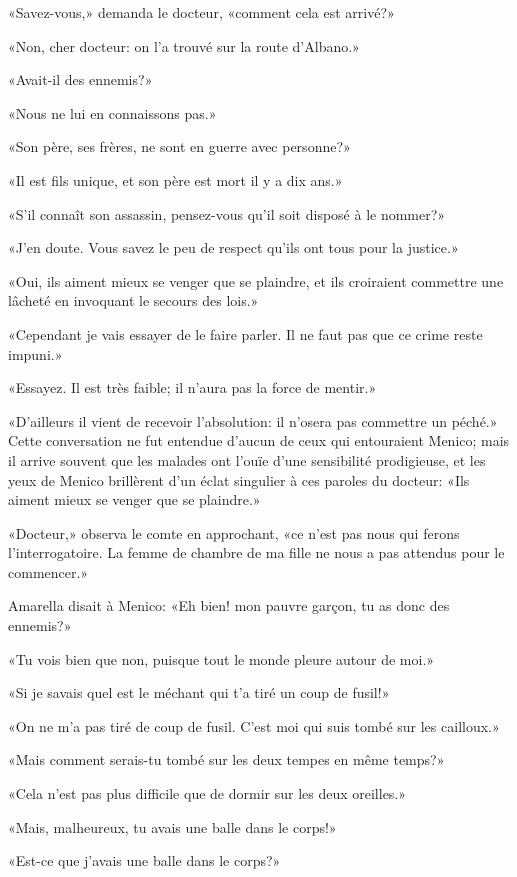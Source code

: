 «Savez-vous,» demanda le docteur, «comment cela est arrivé?»

«Non, cher docteur: on l'a trouvé sur la route d'Albano.»

«Avait-il des ennemis?»

«Nous ne lui en connaissons pas.»

«Son père, ses frères, ne sont en guerre avec personne?»

«Il est fils unique, et son père est mort il y a dix ans.»

«S'il connaît son assassin, pensez-vous qu'il soit disposé à le nommer?»

«J'en doute. Vous savez le peu de respect qu'ils ont tous pour la
justice.»

«Oui, ils aiment mieux se venger que se plaindre, et ils croiraient
commettre une lâcheté en invoquant le secours des lois.»

«Cependant je vais essayer de le faire parler. Il ne faut pas que ce
crime reste impuni.»

«Essayez. Il est très faible; il n'aura pas la force de mentir.»

«D'ailleurs il vient de recevoir l'absolution: il n'osera pas commettre
un péché.» Cette conversation ne fut entendue d'aucun de ceux qui
entouraient Menico; mais il arrive souvent que les malades ont l'ouïe
d'une sensibilité prodigieuse, et les yeux de Menico brillèrent d'un
éclat singulier à ces paroles du docteur: «Ils aiment mieux se venger
que se plaindre.»

«Docteur,» observa le comte en approchant, «ce n'est pas nous qui ferons
l'interrogatoire. La femme de chambre de ma fille ne nous a pas attendus
pour le commencer.»

Amarella disait à Menico: «Eh bien! mon pauvre garçon, tu as donc des
ennemis?»

«Tu vois bien que non, puisque tout le monde pleure autour de moi.»

«Si je savais quel est le méchant qui t'a tiré un coup de fusil!»

«On ne m'a pas tiré de coup de fusil. C'est moi qui suis tombé sur les
cailloux.»

«Mais comment serais-tu tombé sur les deux tempes en même temps?»

«Cela n'est pas plus difficile que de dormir sur les deux oreilles.»

«Mais, malheureux, tu avais une balle dans le corps!»

«Est-ce que j'avais une balle dans le corps?»


